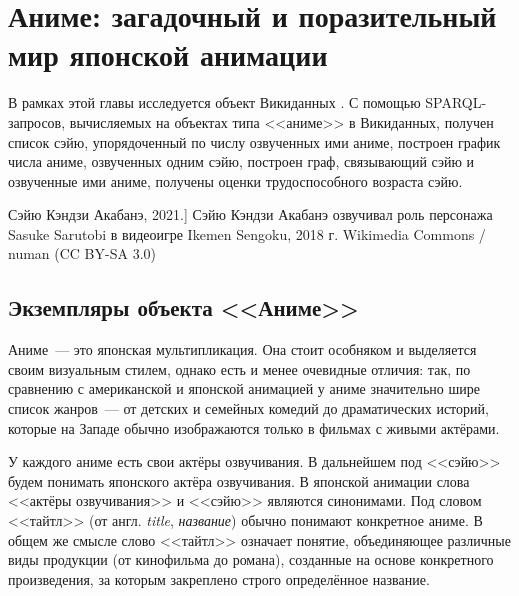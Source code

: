 
\chapter{Аниме: загадочный и поразительный мир японской анимации}
\label{ch:anime}


В рамках этой главы исследуется объект Викиданных . С помощью SPARQL-запросов, вычисляемых на объектах типа <<аниме>> в Викиданных, получен список сэйю, упорядоченный по числу озвученных ими аниме, построен график числа аниме, озвученных одним сэйю, построен граф, связывающий сэйю и озвученные ими аниме, получены оценки трудоспособного возраста сэйю. 

\begin{marginfigure}[0.0cm]
{
	\setlength{\fboxsep}{0pt}%
	\setlength{\fboxrule}{1pt}%
}
\caption
[Сэйю Кэндзи Акабанэ, 2021.]
{
Сэйю Кэндзи Акабанэ озвучивал роль персонажа Sasuke Sarutobi в видеоигре Ikemen Sengoku, 2018 г.\newline
Wikimedia Commons / numan (CC BY-SA 3.0)
}
\label{fig:seiyu}
\end{marginfigure}

\section{Экземпляры объекта <<Аниме>>}

Аниме~--- это японская мультипликация. Она стоит особняком и выделяется своим визуальным стилем, однако есть и менее очевидные отличия: так, по сравнению с американской и японской анимацией у аниме значительно шире список жанров~--- от детских и семейных комедий до драматических историй, которые на Западе обычно изображаются только в фильмах с живыми актёрами\autocite{anime_vs_animation}.

У каждого аниме есть свои актёры озвучивания. В дальнейшем под <<сэйю>> будем понимать японского актёра озвучивания. В японской анимации слова <<актёры озвучивания>> и <<сэйю>> являются синонимами\autocite{shikimori}. Под словом <<тайтл>> (от англ. \emph{title}, \emph{название}) обычно понимают конкретное аниме\autocite{anime_social}. В общем же смысле слово <<тайтл>> означает понятие, объединяющее различные виды продукции (от кинофильма до романа), созданные на основе конкретного произведения, за которым закреплено строго определённое название\autocite{anime_title_def}.

